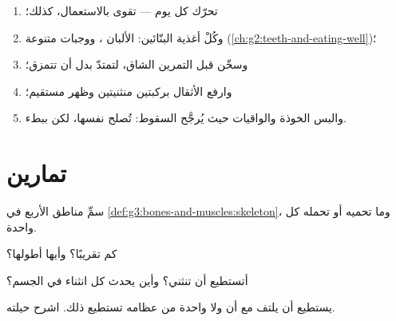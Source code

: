 \begin{method}\label{met:g3:bones-and-muscles:care}
\begin{enumerate}
  \item تحرّك كل يوم ---  تقوى بالاستعمال،  كذلك؛
  \item وكُلْ أغذية البنّائين: الألبان ، ووجبات متنوعة
        (\cref{ch:g2:teeth-and-eating-well})؛
  \item وسخّن قبل التمرين الشاق، لتمتدّ  بدل أن تتمزق؛
  \item وارفع الأثقال بركبتين منثنيتين وظهر مستقيم؛
  \item والبس الخوذة والواقيات حيث يُرجَّح السقوط:  تُصلح
        نفسها، لكن ببطء.
\end{enumerate}
\end{method}

\section{تمارين}

\begin{exercise}[$\star$]\label{exo:g3:bones-and-muscles:1}
سمِّ مناطق  الأربع في
\cref{def:g3:bones-and-muscles:skeleton}، وما تحميه أو تحمله كل
واحدة.
\end{exercise}

\begin{exercise}[$\star$]\label{exo:g3:bones-and-muscles:2}
كم   تقريبًا؟ وأيها أطولها؟
\end{exercise}

\begin{exercise}[$\star$]\label{exo:g3:bones-and-muscles:3}
أتستطيع  أن تنثني؟ وأين يحدث كل انثناء في الجسم؟
\end{exercise}

\begin{exercise}[$\star$]\label{exo:g3:bones-and-muscles:4}
يستطيع  أن يلتف مع أن ولا واحدة من عظامه تستطيع ذلك.
اشرح حيلته.
\end{exercise}

